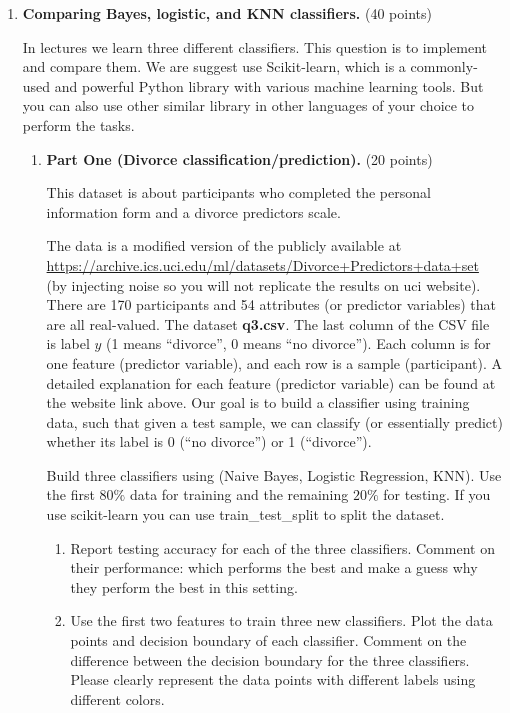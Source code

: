 \documentclass[twoside,12pt]{article}
\begin{document}
\begin{enumerate}
\begin{enumerate}
\end{enumerate}




\clearpage

\item {\bf Comparing Bayes, logistic, and KNN classifiers.} (40 points)

In lectures we learn three different classifiers. This question is to implement and compare them. We are suggest use \textsf{Scikit-learn}, which is a commonly-used and powerful \textsf{Python} library with various machine learning tools. But you can also use other similar library in other languages of your choice to perform the tasks. 


\begin{enumerate}

\item \textbf{Part One (Divorce classification/prediction).} (20 points) 

This dataset is about participants who completed the personal information form and a divorce predictors scale. 

The data is a modified version of the publicly available at \url{https://archive.ics.uci.edu/ml/datasets/Divorce+Predictors+data+set} (by injecting noise so you will not replicate the results on uci website). There are 170 participants and 54 attributes (or predictor variables) that are all real-valued. The dataset \textbf{q3.csv}. The last column of the CSV file is label $y$ (1 means ``divorce'', 0 means ``no divorce''). Each column is for one feature (predictor variable), and each row is a sample (participant). A detailed explanation for each feature (predictor variable) can be found at the website link above. Our goal is to build a classifier using training data, such that given a test sample, we can classify (or essentially predict) whether its label is 0 (``no divorce'') or 1 (``divorce''). 



Build three classifiers using (Naive Bayes, Logistic Regression, KNN). Use the first $80\%$ data for training and the remaining $20\%$ for testing. If you use \textsf{scikit-learn} you can use \textsf{train\_test\_split} to split the dataset. 

\begin{enumerate}

	\item Report testing accuracy for each of the three classifiers.  Comment on their performance: which performs the best and make a guess why they perform the best in this setting. 
	\item Use the first two features to train three new classifiers. Plot the data points and decision boundary of each classifier. Comment on the difference between the decision boundary for the three classifiers. Please clearly represent the data points with different labels using different colors.
\end{enumerate}


\end{enumerate}
\end{enumerate}
\end{document}
